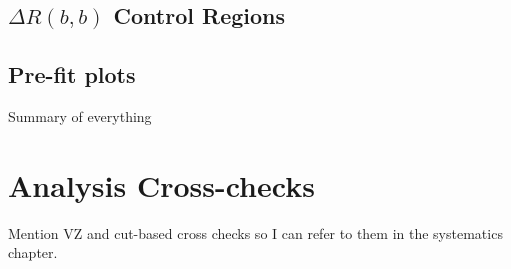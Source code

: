 \subsection{\texorpdfstring{$\Delta R(b,b)$}{DRbb} Control Regions}%
\label{sec:control-region-defintions}

\subsection{Pre-fit plots}
Summary of everything






\section{Analysis Cross-checks}
Mention VZ and cut-based cross checks so I can refer to them in the systematics
chapter.





